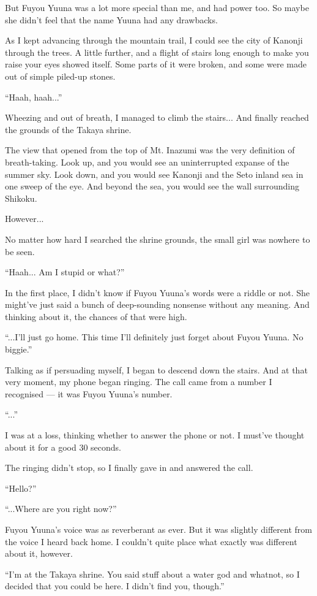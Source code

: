 But Fuyou Yuuna was a lot more special than me, and had power too. So maybe she didn't feel that the name Yuuna had any drawbacks.

As I kept advancing through the mountain trail, I could see the city of Kanonji through the trees. A little further, and a flight of stairs long enough to make you raise your eyes showed itself. Some parts of it were broken, and some were made out of simple piled-up stones.

``Haah, haah...''

Wheezing and out of breath, I managed to climb the stairs... And finally reached the grounds of the Takaya shrine.

The view that opened from the top of Mt. Inazumi was the very definition of breath-taking. Look up, and you would see an uninterrupted expanse of the summer sky. Look down, and you would see Kanonji and the Seto inland sea in one sweep of the eye. And beyond the sea, you would see the wall surrounding Shikoku.

However...

No matter how hard I searched the shrine grounds, the small girl was nowhere to be seen.

``Haah... Am I stupid or what?''

In the first place, I didn't know if Fuyou Yuuna's words were a riddle or not. She might've just said a bunch of deep-sounding nonsense without any meaning. And thinking about it, the chances of that were high.

``...I'll just go home. This time I'll definitely just forget about Fuyou Yuuna. No biggie.''

Talking as if persuading myself, I began to descend down the stairs. And at that very moment, my phone began ringing. The call came from a number I recognised --- it was Fuyou Yuuna's number.

``...''

I was at a loss, thinking whether to answer the phone or not. I must've thought about it for a good 30 seconds.

The ringing didn't stop, so I finally gave in and answered the call.

``Hello?''

``...Where are you right now?''

Fuyou Yuuna's voice was as reverberant as ever. But it was slightly different from the voice I heard back home. I couldn't quite place what exactly was different about it, however.

``I'm at the Takaya shrine. You said stuff about a water god and whatnot, so I decided that you could be here. I didn't find you, though.''

